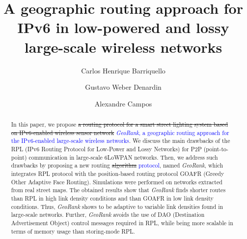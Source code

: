 \documentclass[final,authoryear,3p,twocolumn]{elsarticle}
\newcommand{\rev}{\textcolor{blue}}
\begin{document}
\begin{frontmatter}



\title{A geographic routing approach for IPv6 in low-powered and lossy large-scale wireless networks}



\author[addr1]{Carlos Henrique Barriquello}
\author[addr2]{Gustavo Weber Denardin}
\author[addr1]{Alexandre Campos}
\address[addr1]{Electronic Ballast Researching Group (GEDRE) - Intelligence in Lighting, Federal University of Santa Maria(UFSM), Santa Maria, RS, 97105-900, Brazil}
\address[addr2]{Technological Federal University of Paran$\acute{a}$, Pato Branco, PR, 85503-390, Brazil}


\begin{abstract}
In this paper, we propose \sout{a routing protocol for a smart street lighting system based on IPv6-enabled wireless sensor network} \rev{\textit{GeoRank}, a geographic routing approach for the IPv6-enabled large-scale  wireless networks}. We discuss the main drawbacks of the RPL (IPv6 Routing Protocol for
Low-Power and Lossy Networks) for P2P (point-to-point) communication in large-scale 6LoWPAN networks. Then, we address such drawbacks by proposing a new routing \sout{algorithm} \rev{protocol}, named \textit{GeoRank}, which integrates RPL protocol with the position-based routing protocol GOAFR (Greedy Other Adaptive Face Routing). Simulations were performed on networks extracted from real street maps. The obtained results show that \textit{GeoRank} finds shorter routes than RPL in high link density conditions and than GOAFR in low link density conditions. Thus, \textit{GeoRank} shows to be adaptive to variable link densities found in large-scale networks. Further, \textit{GeoRank} avoids the use of DAO (Destination Advertisement Object) control messages required in RPL, while being more scalable in terms of memory usage than storing-mode RPL.
\end{abstract}



\end{frontmatter}
\end{document}
